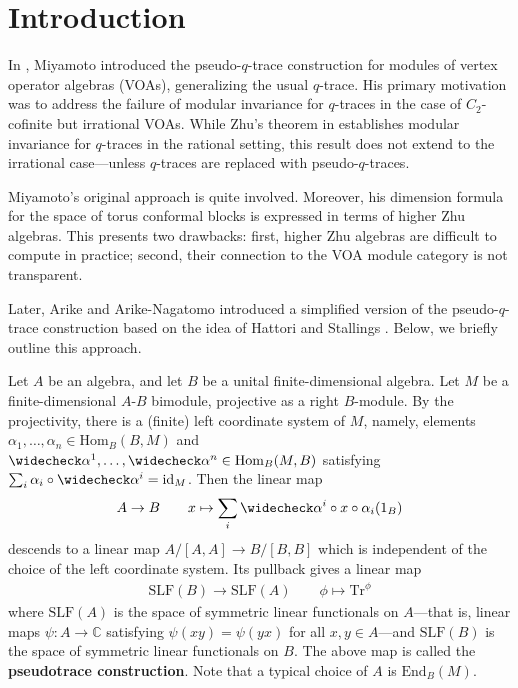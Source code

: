 \documentclass[11pt,b5paper,notitlepage]{article}
\theoremstyle{definition}
\theoremstyle{plain}
\newcommand{\wch}{\widecheck}
\newcommand{\Tr}{\mathrm{Tr}}
\newcommand{\End}{\mathrm{End}} %
\newcommand{\id}{\mathrm{id}}
\newcommand{\Hom}{\mathrm{Hom}}
\newcommand{\Cbb}{\mathbb C}
\newcommand{\SLF}{\mathrm{SLF}}
\numberwithin{equation}{section}
\begin{document}
\tableofcontents



\section{Introduction}


In \cite{Miy-modular-invariance}, Miyamoto introduced the pseudo-$q$-trace construction for modules of vertex operator algebras (VOAs), generalizing the usual $q$-trace. His primary motivation was to address the failure of modular invariance for $q$-traces in the case of $C_2$-cofinite but irrational VOAs. While Zhu's theorem in \cite{Zhu-modular-invariance} establishes modular invariance for $q$-traces in the rational setting, this result does not extend to the irrational case---unless $q$-traces are replaced with pseudo-$q$-traces.

Miyamoto's original approach is quite involved. Moreover, his dimension formula for the space of torus conformal blocks is expressed in terms of higher Zhu algebras. This presents two drawbacks: first, higher Zhu algebras are difficult to compute in practice; second, their connection to the VOA module category is not transparent.

Later, Arike \cite{Ari10} and Arike-Nagatomo \cite{AN-pseudo-trace} introduced a simplified version of the pseudo-$q$-trace construction based on the idea of Hattori \cite{Hattori65} and Stallings \cite{Stallings}. Below, we briefly outline this approach.

Let $A$ be an algebra, and let $B$ be a unital finite-dimensional algebra. Let $M$ be a finite-dimensional $A$-$B$ bimodule, projective as a right $B$-module. By the projectivity, there is a (finite) left coordinate system of $M$, namely, elements $\alpha_1,\dots,\alpha_n\in\Hom_B(B,M)$ and $\wch\alpha^1,\dots,\wch\alpha^n\in\Hom_B(M,B)$ satisfying $\sum_i\alpha_i\circ\wch\alpha^i=\id_M$. Then the linear map 
\begin{gather*}
A\rightarrow B\qquad x\mapsto\sum_i \wch\alpha^i\circ x\circ\alpha_i(1_B)
\end{gather*}
descends to a linear map $A/[A,A]\rightarrow B/[B,B]$ which is independent of the choice of the left coordinate system. Its pullback gives a linear map
\begin{align}\label{eq18}
\SLF(B)\rightarrow\SLF(A)\qquad \phi\mapsto\Tr^\phi
\end{align}
where $\SLF(A)$ is the space of symmetric linear functionals on $A$---that is, linear maps $\psi:A\rightarrow\Cbb$ satisfying $\psi(xy)=\psi(yx)$ for all $x,y\in A$---and $\SLF(B)$ is the space of symmetric linear functionals on $B$. The above map is called the \textbf{pseudotrace construction}. Note that a typical choice of $A$ is $\End_B(M)$.
\end{document}
